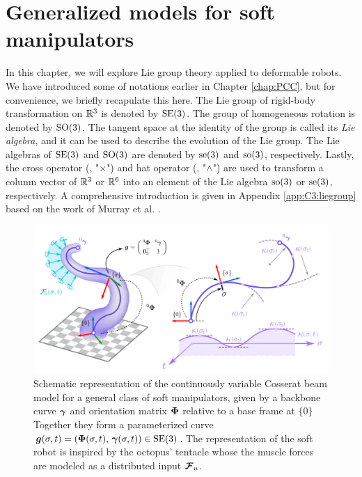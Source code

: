 \section{Generalized models for soft manipulators} \label{sec:chap3_model}
In this chapter, we will explore Lie group theory applied to deformable robots. We have introduced some of notations earlier in Chapter \ref{chap:PCC}, but for convenience, we briefly recapulate this here. The Lie group of rigid-body transformation on $\mathbb{R}^3$ is denoted by $\textup{\textrm{SE}}(3)$. The group of homogeneous rotation is denoted by $\textup{\textrm{SO}}(3)$. The tangent space at the identity of the group is called its \textit{Lie algebra}, and it can be used to describe the evolution of the Lie group. The Lie algebras of $\textup{\textrm{SE}}(3)$ and $\textup{\textrm{SO}}(3)$ are denoted by $\textup{\textrm{se}}(3)$ and $\textup{\textrm{so}}(3)$, respectively. Lastly, the cross operator (\ie, "$\times$") and hat operator (\ie, "$\wedge$") are used to transform a column vector of $\mathbb{R}^3$ or $\mathbb{R}^6$ into an element of the Lie algebra $\textup{\textrm{so}}(3)$ or $\textup{\textrm{se}}(3)$, respectively. A comprehensive introduction is given in Appendix \ref{app:C3:liegroup} based on the work of Murray et al. \cite{Murray1994}. 

\begin{figure}[!t]
  \vspace{-2mm}
  \centering
  \includegraphics[width = \textwidth]{./pdf/thesis-figure-5-1.pdf}
  \caption{\small Schematic representation of the continuously variable Cosserat beam model for a general class of soft manipulators, given by a backbone curve ${\boldsymbol{\gamma}}$ and orientation matrix ${\boldsymbol{\Phi}}$ relative to a base frame at $\{0\}$ Together they form a parameterized curve ${\boldsymbol{g}}(\sigma,t) = ({\boldsymbol{\Phi}}(\sigma,t),\, {\boldsymbol{\gamma}}(\sigma,t)) \in \textup{\textrm{SE}}(3)$. The representation of the soft robot is inspired by the octopus' tentacle whose the muscle forces are modeled as a distributed input ${\boldsymbol{\mathcal{F}}}_u$. \label{fig:C3:example1}}
\end{figure}

